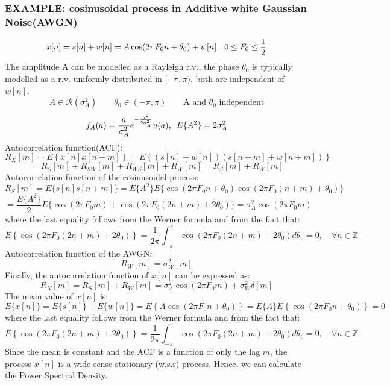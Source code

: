 \subsubsection{EXAMPLE: cosinusoidal process in Additive white Gaussian Noise(AWGN)}
\[
x[n]=s[n]+w[n]=A\cos(2\pi F_0n+\theta_0)+w[n],\hspace{0.5em}0\leq F_0\leq\frac{1}{2}
\]
The amplitude A can be modelled as a Rayleigh r.v., the phase \(\theta_0\) is typically modelled as a r.v. uniformly distributed in \([-\pi,\pi)\), both are independent of \(w[n]\).
\[
A\in\mathcal{R}(\sigma^2_A) \hspace{2em} \theta_0\in(-\pi,\pi)\hspace{2em}\text{A and \(\theta_0\) independent}
\]
\[
f_A(a)=\frac{a}{\sigma_A^2}e^{-\frac{a^2}{2\sigma_A^2}}u(a),\hspace{0.5em}E\{A^2\}=2\sigma^2_A
\]
Autocorrelation function(ACF):
\[
R_X[m] = E\left\{ x[n]x[n+m] \right\}
= E\left\{ \left( s[n] + w[n] \right) \left( s[n+m] + w[n+m] \right) \right\}
\]\[
= R_S[m] + R_{SW}[m] + R_{WS}[m] + R_W[m]
= R_S[m] + R_W[m]
\]
Autocorrelation function of the cosinusoidal process:
\[
R_S[m] = E\{s[n]s[n+m]\} 
= E\{A^2\} E\{\cos(2\pi F_0 n + \theta_0)\cos(2\pi F_0 (n+m) + \theta_0)\}
\]
\[
= \frac{E\{A^2\}}{2} E\{\cos(2\pi F_0 m) + \cos(2\pi F_0 (2n+m) + 2\theta_0)\}
= \sigma_A^2 \cos(2\pi F_0 m)
\]
where the last equality follows from the Werner formula and from the fact that:
\[
E\left\{ \cos\left(2\pi F_0(2n+m)+2\theta_0\right) \right\}
= \frac{1}{2\pi} \int_{-\pi}^{\pi} \cos\left(2\pi F_0 (2n+m) + 2\theta_0 \right) d\theta_0 = 0, \quad \forall n \in \mathbb{Z}
\]
Autocorrelation function of the AWGN:
\[
R_W[m]=\sigma_W^2[m]
\]
Finally, the autocorrelation function of \(x[n]\) can be expressed as:
\[
R_X[m]=R_S[m]+R_W[m]=\sigma_A^2\cos(2\pi F_0m)+\sigma_W^2\delta[m]
\]
The mean value of \(x[n]\) is:
\[
E\{x[n]\} = E\{s[n]\} + E\{w[n]\}
= E\left\{A\cos\left(2\pi F_0 n + \theta_0\right)\right\}
= E\{A\} E\left\{\cos\left(2\pi F_0 n + \theta_0\right)\right\} = 0
\]
where the last equality follows from the Werner formula and from the fact that:
\[
E\left\{ \cos\left(2\pi F_0(2n+m)+2\theta_0\right) \right\}
= \frac{1}{2\pi} \int_{-\pi}^{\pi} \cos\left(2\pi F_0 (2n+m) + 2\theta_0 \right) d\theta_0 = 0, \quad \forall n \in \mathbb{Z}
\]
Since the mean is constant and the ACF is a function of only the lag \(m\), the process \(x[n]\) is a wide sense stationary (w.s.s) process. Hence, we can calculate the Power Spectral Density.\\

